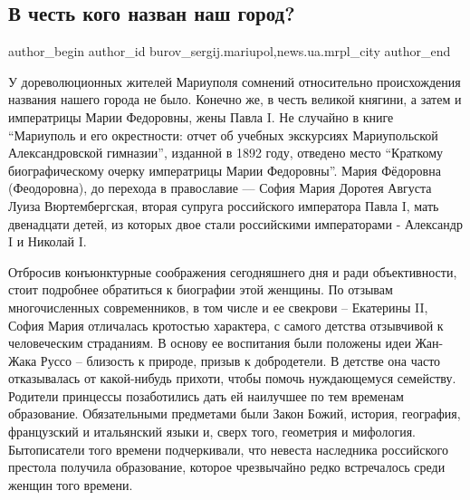  
 
 
 
 
 
\subsection{В честь кого назван наш город?}
\label{sec:04_08_2018.stz.news.ua.mrpl_city.1.v_chest_kogo_nazvan_nash_gorod}
 
\ifcmt
 author_begin
   author_id burov_sergij.mariupol,news.ua.mrpl_city
 author_end
\fi


У дореволюционных жителей Мариуполя сомнений относительно происхождения
названия нашего города не было. Конечно же, в честь великой княгини, а затем и
императрицы Марии Федоровны, жены Павла I. Не случайно в книге \enquote{Мариуполь и его
окрестности: отчет об учебных экскурсиях Мариупольской Александровской
гимназии}, изданной в 1892 году, отведено место \enquote{Краткому биографическому
очерку императрицы Марии Федоровны}. Мария Фёдоровна (Феодоровна), до перехода
в православие — София Мария Доротея Августа Луиза Вюртембергская, вторая
супруга российского императора Павла I, мать двенадцати детей, из которых двое
стали российскими императорами -  Александр I и Николай I.

Отбросив конъюнктурные соображения сегодняшнего дня и ради объективности, стоит
подробнее обратиться к биографии этой женщины. По отзывам многочисленных
современников, в том числе и ее свекрови – Екатерины II, София Мария отличалась
кротостью характера, с самого детства отзывчивой к человеческим страданиям. В
основу ее воспитания были положены идеи Жан-Жака Руссо – близость к природе,
призыв к добродетели. В детстве она часто отказывалась от какой-нибудь прихоти,
чтобы помочь нуждающемуся семейству. Родители принцессы позаботились дать ей
наилучшее по тем временам образование. Обязательными предметами были Закон
Божий, история, география, французский и итальянский языки и, сверх того,
геометрия и мифология. Бытописатели того времени подчеркивали, что невеста
наследника российского престола получила образование, которое чрезвычайно редко
встречалось среди женщин того времени.

